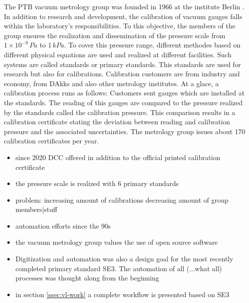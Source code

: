 \documentclass[3p,times,procedia]{elsarticle}
\begin{document}
The PTB vacuum metrology group was founded in 1966 at the institute
Berlin \cite{jou19, jou04}. In addition to research and development,
the calibration of vacuum gauges falls within the laboratory's
responsibilities. To this objective, the members of the group ensures
the realization and dissemination of the pressure scale from
$1\times10^{-9}\,Pa$ to $1\,kPa$. To cover this pressure range,
different methodes based on different physical equations are used and
realized at different facilities.  Such systems are called standards
or primary standards. This standards are used for research but also
for calibrations. Calibration customers are from industry and economy,
from DAkks and also other metrology institutes. At a glace, a
calibration process runs as follows: Customers sent gauges which are
installed at the standards. The reading of this gauges are compared to
the pressure realized by the standards called the calibration
pressure. This comparison results in a calibration certificate stating
the deviation between reading and calibration pressure and the
associated uncertainties. The metrology group issues about 170
calibration certificates per year.


\begin{itemize}
\item since 2020 DCC offered in addition to the official printed calibration certificate
\item the pressure scale is realized with 6 primary standards
\item problem: increasing amount of calibrations decreasing amount of
  group members|stuff
\item automation efforts since the 90s \cite{jouce3, joufm3} 
\item the vacuum metrology group values the use of open source
  software
\item Digitization and automation was also a design goal for the most
  recently completed primary standard SE3.  The automation of all
  (...what all) processes was thought along from the beginning
\item in section \ref{ssec:vl-work} a complete workflow is presented based on SE3
\end{itemize}

    

\end{document}
